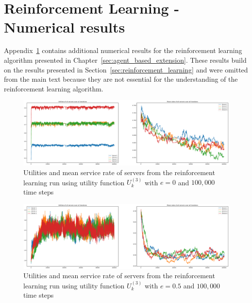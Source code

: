 \chapter{Reinforcement Learning - Numerical results}
\label{appendix:reinforcement_learning}

Appendix~\ref{appendix:reinforcement_learning} contains additional numerical
results for the reinforcement learning algorithm presented in
Chapter~\ref{sec:agent_based_extension}.
These results build on the results presented in
Section~\ref{sec:reinforcement_learning} and were omitted from the main text
because they are not essential for the understanding of the reinforcement
learning algorithm.

\begin{figure}[H]
    \includegraphics[width=\textwidth]{chapters/00_appendix/03_more_rl_results/Bin/utility_3_eps/u3_1_e0.eps}
    \caption{Utilities and mean service rate of servers from the reinforcement
    learning run using utility function \(U_k^{(3)}\) with \(e = 0\) and
    \(100,\!000\) time steps}
    \label{fig:RL_utility3_1_e0}
\end{figure}

\begin{figure}[H]
    \includegraphics[width=\textwidth]{chapters/00_appendix/03_more_rl_results/Bin/utility_3_eps/u3_1_e05.eps}
    \caption{Utilities and mean service rate of servers from the reinforcement
    learning run using utility function \(U_k^{(3)}\) with \(e = 0.5\) and
    \(100,\!000\) time steps}
    \label{fig:RL_utility3_1_e05}
\end{figure}

